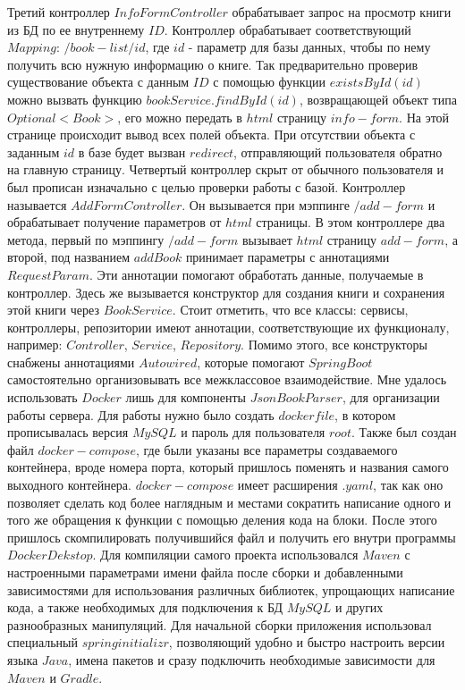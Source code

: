 \newline Третий контроллер $InfoFormController$ обрабатывает запрос на просмотр книги из БД по ее внутреннему $ID$. Контроллер обрабатывает соответствующий $Mapping$: $/book-list/{id}$, где $id$ - параметр для базы данных, чтобы по нему получить всю нужную информацию о книге. Так предварительно проверив существование объекта с данным $ID$ с помощью функции $existsById(id)$ можно вызвать функцию $bookService.findById(id)$, возвращающей объект типа $Optional<Book>$, его можно передать в $html$ страницу $info-form$. На этой странице происходит вывод всех полей объекта. При отсутствии объекта с заданным $id$ в базе будет вызван $redirect$, отправляющий пользователя обратно на главную страницу.
\newline Четвертый контроллер скрыт от обычного пользователя и был прописан изначально с целью проверки работы с базой. Контроллер называется $AddFormController$. Он вызывается при мэппинге $/add-form$ и обрабатывает получение параметров от $html$ страницы. В этом контроллере два метода, первый по мэппингу $/add-form$ вызывает $html$ страницу $add-form$, а второй, под названием $addBook$ принимает параметры с аннотациями $RequestParam$. Эти аннотации помогают обработать данные, получаемые в контроллер. Здесь же вызывается конструктор для создания книги и сохранения этой книги через $BookService$.
\newline \newline Стоит отметить, что все классы: сервисы, контроллеры, репозитории имеют аннотации, соответствующие их функционалу, например: $Controller$, $Service$, $Repository$. Помимо этого, все конструкторы снабжены аннотациями $Autowired$, которые помогают $Spring Boot$ самостоятельно организовывать все межклассовое взаимодействие.
\newline Мне удалось использовать $Docker$ лишь для компоненты $JsonBookParser$, для организации работы сервера. Для работы нужно было создать $dockerfile$, в котором прописывалась версия $MySQL$ и пароль для пользователя $root$. Также был создан файл $docker-compose$, где были указаны все параметры создаваемого контейнера, вроде номера порта, который пришлось поменять и названия самого выходного контейнера. $docker-compose$ имеет расширения $.yaml$, так как оно позволяет сделать код более наглядным и местами сократить написание одного и того же обращения к функции с помощью деления кода на блоки. После этого пришлось скомпилировать получившийся файл и получить его внутри программы $Docker Dekstop$. Для компиляции самого проекта использовался $Maven$ с настроенными параметрами имени файла после сборки и добавленными зависимостями для использования различных библиотек, упрощающих написание кода, а также необходимых для подключения к БД $MySQL$ и других разнообразных манипуляций. Для начальной сборки приложения использовал специальный $spring initializr$, позволяющий удобно и быстро настроить версии языка $Java$, имена пакетов и сразу подключить необходимые зависимости для $Maven$ и $Gradle$.
